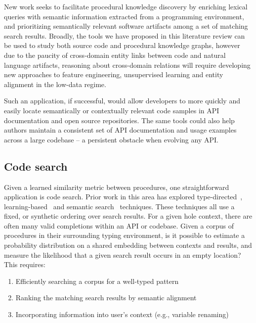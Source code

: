 \documentclass[10pt]{article}
\begin{document}
New work seeks to facilitate procedural knowledge discovery by enriching lexical queries with semantic information extracted from a programming environment, and prioritizing semantically relevant software artifacts among a set of matching search results. Broadly, the tools we have proposed in this literature review can be used to study both source code and procedural knowledge graphs, however due to the paucity of cross-domain entity links between code and natural language artifacts, reasoning about cross-domain relations will require developing new approaches to feature engineering, unsupervised learning and entity alignment in the low-data regime.

Such an application, if successful, would allow developers to more quickly and easily locate semantically or contextually relevant code samples in API documentation and open source repositories. The same tools could also help authors maintain a consistent set of API documentation and usage examples across a large codebase -- a persistent obstacle when evolving any API.

  \pagebreak\subsection{Code search}\label{subsec:code-search}

Given a learned similarity metric between procedures, one straightforward application is code search. Prior work in this area has explored type-directed~\cite{james2020digging}, learning-based~\cite{gu2018deep} and semantic search~\cite{premtoon2020semantic} techniques. These techniques all use a fixed, or synthetic ordering over search results. For a given hole context, there are often many valid completions within an API or codebase. Given a corpus of procedures in their surrounding typing environment, is it possible to estimate a probability distribution on a shared embedding between contexts and results, and measure the likelihood that a given search result occurs in an empty location? This requires:

  \begin{enumerate}
    \item Efficiently searching a corpus for a well-typed pattern
    \item Ranking the matching search results by semantic alignment
    \item Incorporating information into user's context (e.g., variable renaming)
  \end{enumerate}
\end{document}
